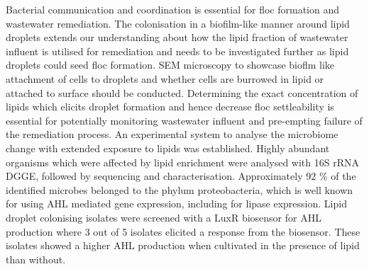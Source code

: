 \documentclass[11pt]{article}
\begin{document}
Bacterial communication and coordination is essential for floc formation and wastewater remediation. The colonisation in a biofilm-like manner around lipid droplets extends our understanding about how the lipid fraction of wastewater influent is utilised for remediation and needs to be investigated further as lipid droplets could seed floc formation. SEM microscopy to showcase bioflm like attachment of cells to droplets and whether cells are burrowed in lipid or attached to surface should be conducted. Determining the exact concentration of lipids which elicits droplet formation and hence decrease floc settleability is essential for potentially monitoring wastewater influent and pre-empting failure of the remediation process. An experimental system to analyse the microbiome change with extended exposure to lipids was established. Highly abundant organisms which were affected by lipid enrichment were analysed with 16S rRNA DGGE, followed by sequencing and characterisation. Approximately 92 \% of the identified microbes belonged to the phylum proteobacteria, which is well known for using AHL mediated gene expression, including for lipase expression. Lipid droplet colonising isolates were screened with a LuxR biosensor for AHL production where 3 out of 5 isolates elicited a response from the biosensor. These isolates showed a higher AHL production when cultivated in the presence of lipid than without.
\end{document}
